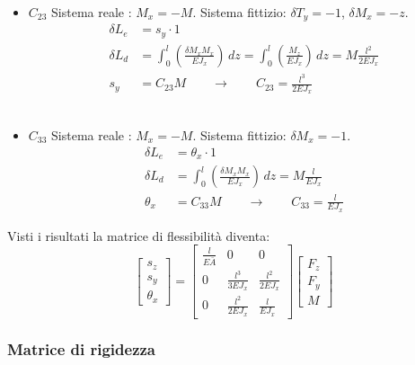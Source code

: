 \begin{itemize}
    \item $C_{23}$
    Sistema reale :  $M_x =-M$. Sistema fittizio: $\delta T_y = -1$, $\delta M_x = -z$. 
    \begin{align*}
        \delta L_e &= s_y \cdot 1 \\
        \delta L_d &= \int_0^l \left(   \frac{\delta M_xM_x}{EJ_x}\right)\,dz 
        =\int_0^l \left(    \frac{M_z}{EJ_x}  \right)\,dz 
        = M\frac{l^2}{2EJ_x}\\
        s_y &= C_{23} M\quad \quad\rightarrow\quad\quad C_{23} =\frac{l^3}{2EJ_x}
    \end{align*}\\
    
    \item $C_{33}$
    Sistema reale :  $M_x =-M$. Sistema fittizio: $\delta M_x = -1$. 
    \begin{align*}
        \delta L_e &= \theta_x \cdot 1 \\
        \delta L_d &= \int_0^l \left(   \frac{\delta M_xM_x}{EJ_x}\right)\,dz 
        = M\frac{l}{EJ_x}\\
        \theta_x &= C_{33} M\quad \quad\rightarrow\quad\quad C_{33} =\frac{l}{EJ_x}
    \end{align*}
    
\end{itemize}

Visti i risultati la matrice di flessibilità diventa:
\begin{equation*}
    \begin{bmatrix}
s_z \\
s_y \\
\theta_x
\end{bmatrix}
=
\begin{bmatrix}
\frac{l}{E\bar{A}} & 0 & 0 \\
0 & \frac{l^3}{3EJ_x} & \frac{l^2}{2EJ_x} \\
0 & \frac{l^2}{2EJ_x} & \frac{l}{EJ_x}
\end{bmatrix}
\begin{bmatrix}
F_z\\
F_y \\
M
\end{bmatrix}
\end{equation*}


\subsubsection*{Matrice di rigidezza}


